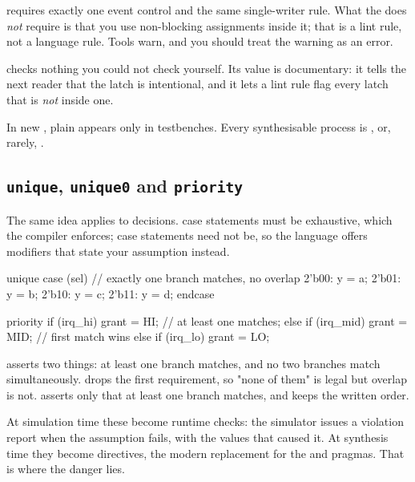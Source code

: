  requires exactly one event control and the same
single-writer rule. What the \LRM{} does \emph{not} require is that you use
non-blocking assignments inside it; that is a lint rule, not a language rule.
Tools warn, and you should treat the warning as an error.

 checks nothing you could not check yourself. Its value is
documentary: it tells the next reader that the latch is intentional, and it
lets a lint rule flag every latch that is \emph{not} inside one.

\begin{ruleofthumb}
In new \SV{} \RTL{}, plain  appears only in testbenches. Every
synthesisable process is ,  or, rarely,
.
\end{ruleofthumb}

\subsection{\texttt{unique}, \texttt{unique0} and \texttt{priority}}

The same idea applies to decisions. \VHDL{} case statements must be
exhaustive, which the compiler enforces; \SV{} case statements need not be,
so the language offers modifiers that state your assumption instead.

\begin{svcode}
unique case (sel)          // exactly one branch matches, no overlap
  2'b00: y = a;
  2'b01: y = b;
  2'b10: y = c;
  2'b11: y = d;
endcase

priority if (irq_hi)  grant = HI;   // at least one matches;
else if (irq_mid) grant = MID;      // first match wins
else if (irq_lo)  grant = LO;
\end{svcode}

 asserts two things: at least one branch matches, and no two
branches match simultaneously.  drops the first requirement, so
"none of them" is legal but overlap is not.  asserts only that
at least one branch matches, and keeps the written order.

At simulation time these become runtime checks: the simulator issues a
violation report when the assumption fails, with the values that caused it. At
synthesis time they become directives, the modern replacement for the
 and  pragmas. That is where
the danger lies.

